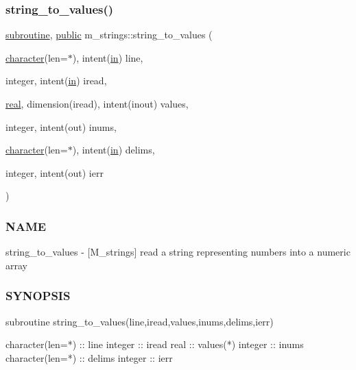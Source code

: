 \subsubsection{\texorpdfstring{string\+\_\+to\+\_\+values()}{string\_to\_values()}}
{\footnotesize\ttfamily \hyperlink{M__stopwatch_83_8txt_acfbcff50169d691ff02d4a123ed70482}{subroutine}, \hyperlink{M__stopwatch_83_8txt_a2f74811300c361e53b430611a7d1769f}{public} m\+\_\+strings\+::string\+\_\+to\+\_\+values (\begin{DoxyParamCaption}\item[{\hyperlink{option__stopwatch_83_8txt_abd4b21fbbd175834027b5224bfe97e66}{character}(len=$\ast$), intent(\hyperlink{M__journal_83_8txt_afce72651d1eed785a2132bee863b2f38}{in})}]{line,  }\item[{integer, intent(\hyperlink{M__journal_83_8txt_afce72651d1eed785a2132bee863b2f38}{in})}]{iread,  }\item[{\hyperlink{read__watch_83_8txt_abdb62bde002f38ef75f810d3a905a823}{real}, dimension(iread), intent(inout)}]{values,  }\item[{integer, intent(out)}]{inums,  }\item[{\hyperlink{option__stopwatch_83_8txt_abd4b21fbbd175834027b5224bfe97e66}{character}(len=$\ast$), intent(\hyperlink{M__journal_83_8txt_afce72651d1eed785a2132bee863b2f38}{in})}]{delims,  }\item[{integer, intent(out)}]{ierr }\end{DoxyParamCaption})}



\subsubsection*{N\+A\+ME}

string\+\_\+to\+\_\+values -\/ \mbox{[}M\+\_\+strings\mbox{]} read a string representing numbers into a numeric array 

\subsubsection*{S\+Y\+N\+O\+P\+S\+IS}

\begin{DoxyVerb}   subroutine string_to_values(line,iread,values,inums,delims,ierr)

    character(len=*) :: line
    integer          :: iread
    real             :: values(*)
    integer          :: inums
    character(len=*) :: delims
    integer          :: ierr
\end{DoxyVerb}


